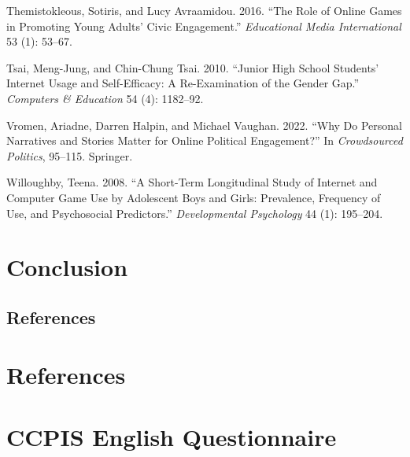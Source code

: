 \documentclass[
  letterpaper,
  DIV=11,
  numbers=noendperiod]{scrreprt}
\newlength{\cslhangindent}
\newlength{\cslentryspacingunit} %
\newenvironment{CSLReferences}[2] %
 {%
  \setlength{\parindent}{0pt}
  \ifodd #1
  \let\oldpar\par
  \def\par{\hangindent=\cslhangindent\oldpar}
  \fi
  \setlength{\parskip}{#2\cslentryspacingunit}
 }%
 {}
\begin{document}
\begin{CSLReferences}{1}{0}
\leavevmode{}%
Themistokleous, Sotiris, and Lucy Avraamidou. 2016. {``{The Role of
Online Games in Promoting Young Adults' Civic Engagement}.''}
\emph{Educational Media International} 53 (1): 53--67.

\leavevmode{}%
Tsai, Meng-Jung, and Chin-Chung Tsai. 2010. {``{Junior High School
Students' Internet Usage and Self-Efficacy: A Re-Examination of the
Gender Gap}.''} \emph{Computers \& Education} 54 (4): 1182--92.

\leavevmode{}%
Vromen, Ariadne, Darren Halpin, and Michael Vaughan. 2022. {``{Why Do
Personal Narratives and Stories Matter for Online Political
Engagement?}''} In \emph{Crowdsourced Politics}, 95--115. Springer.

\leavevmode{}%
Willoughby, Teena. 2008. {``{A Short-Term Longitudinal Study of Internet
and Computer Game Use by Adolescent Boys and Girls: Prevalence,
Frequency of Use, and Psychosocial Predictors}.''} \emph{Developmental
Psychology} 44 (1): 195--204.

\end{CSLReferences}


\hypertarget{sec-chap7}{%
\chapter{Conclusion}\label{sec-chap7}}

\hypertarget{references-6}{%
\section{References}\label{references-6}}

\hypertarget{references-7}{}

\chapter*{References}


\leavevmode{}%
\cleardoublepage
{}
{}
\appendix

\hypertarget{sec-appendix1}{%
\chapter{CCPIS English Questionnaire}\label{sec-appendix1}}
\end{document}

